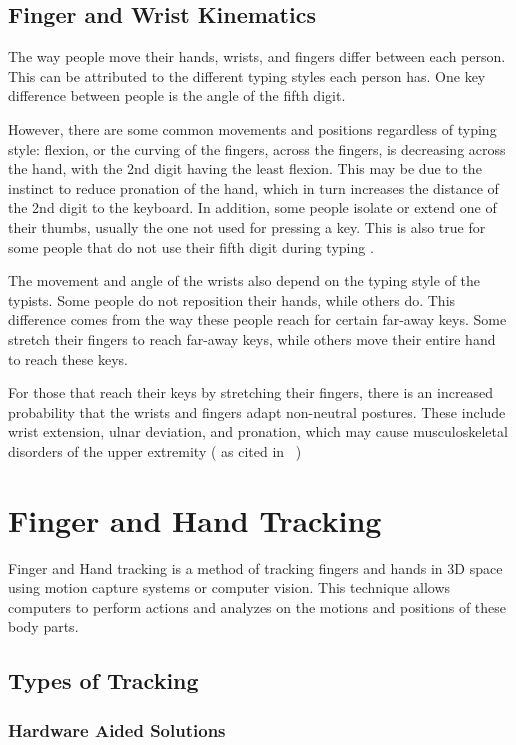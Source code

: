 \documentclass{report}
\begin{document}
\subsection{Finger and Wrist Kinematics}
The way people move their hands, wrists, and fingers differ between each person.
This can be attributed to the different typing styles each person has. One key
difference between people is the angle of the fifth digit.

However, there are some common movements and positions regardless of typing
style: flexion, or the curving of the fingers, across the fingers, is decreasing
across the hand, with the 2nd digit having the least flexion. This may be due to
the instinct to reduce pronation of the hand, which in turn increases the
distance of the 2nd digit to the keyboard. In addition, some people isolate or
extend one of their thumbs, usually the one not used for pressing a key. This is
also true for some people that do not use their fifth digit during typing
\parencite{baker2007}.

The movement and angle of the wrists also depend on the typing style of the
typists. Some people do not reposition their hands, while others do. This
difference comes from the way these people reach for certain far-away keys. Some
stretch their fingers to reach far-away keys, while others move their entire
hand to reach these keys.

For those that reach their keys by stretching their fingers, there is an
increased probability that the wrists and fingers adapt non-neutral postures.
These include wrist extension, ulnar deviation, and pronation, which may cause
musculoskeletal disorders of the upper extremity (\cite{marklin1999} as cited in
~\cite{baker2007})

\section{Finger and Hand Tracking}
Finger and Hand tracking is a method of tracking fingers and hands in 3D space
using motion capture systems or computer vision. This technique allows computers
to perform actions and analyzes on the motions and positions of these body
parts.


\subsection{Types of Tracking}

\subsubsection{Hardware Aided Solutions}
\end{document}
